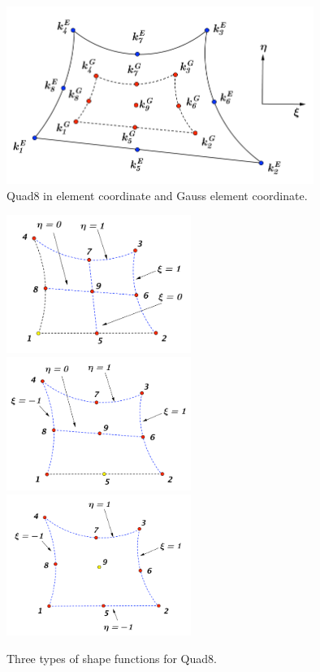 \begin{figure}[h]
	\begin{center}
		\includegraphics[width=10cm,clip]{Quad8_1.pdf}			
		\caption{Quad8 in element coordinate and Gauss element coordinate.} \label{fig: Quad8_1}
	\end{center} 
\end{figure}

\begin{figure}[h]
	\begin{center}
		\includegraphics[width=6cm,clip]{Quad8_2.pdf} 
		\includegraphics[width=6cm,clip]{Quad8_3.pdf}	
		\includegraphics[width=6cm,clip]{Quad8_4.pdf}
		\caption{Three types of shape functions for Quad8.} \label{fig: Quad8_2}	
	\end{center} 
\end{figure}

